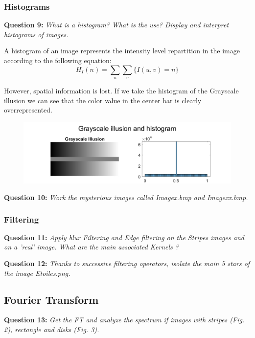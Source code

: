 \subsubsection{Histograms}
\textbf{Question 9:}
\textit{What is a histogram? What is the use? Display and interpret histograms of images.}

A histogram of an image represents the intensity level repartition in the image according to the following equation:
\[H_I(n) = \sum_{u} \sum_{v} \{ I(u, v) = n \}\]

However, spatial information is lost. 
If we take the histogram of the Grayscale illusion we can see that the color value in the center bar is clearly overrepresented.

\begin{figure}[h]
    \centering
    \includegraphics[width=0.75\linewidth]{Doc/Graphics/Part1/part1_Q9.png}
\end{figure}


\textbf{Question 10:}
\textit{Work the mysterious images called Imagex.bmp and Imagexx.bmp.}






\subsubsection{Filtering}
\textbf{Question 11:}
\textit{Apply blur Filtering and Edge ﬁltering on the Stripes images and on a ’real’ image. What are the main associated Kernels ?}



\textbf{Question 12:}
\textit{Thanks to successive ﬁltering operators, isolate the main 5 stars of the image Etoiles.png.}


\subsection{Fourier Transform}
\textbf{Question 13:}
\textit{Get the FT and analyze the spectrum if images with stripes (Fig. 2), rectangle and disks (Fig. 3).}


